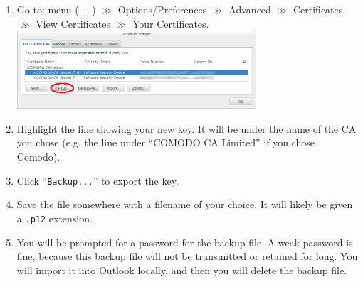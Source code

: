 \begin{enumerate}
  \item Go to: menu ($\equiv$) $\gg$ Options/Preferences $\gg$ Advanced
  $\gg$ Certificates $\gg$ View Certificates $\gg$ Your Certificates.\\[1em]%
  \includegraphics[width=0.7\textwidth]{images/firefox_cert_settings.png}
\item Highlight the line showing your new key.  It will be under the
  name of the CA you chose (e.g. the line under ``COMODO CA Limited''
  if you chose Comodo).
\item %
  Click ``\texttt{Backup...}'' to export the key.
\item Save the file somewhere with a filename of your choice.  It will
  likely be given a \verb|.p12| extension.
\item\label{makebupw} You will be prompted for a password for the
  backup file.  A weak password is fine, because this backup file will
  not be transmitted or retained for long.  You will import it into
  Outlook locally, and then you will delete the backup file.
\end{enumerate}
